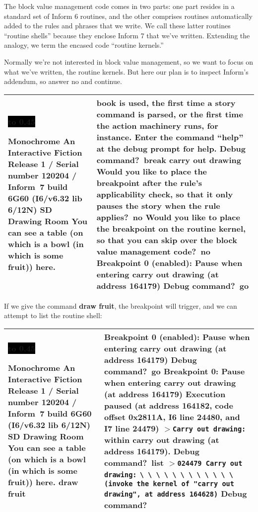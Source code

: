\documentclass{book}
\newcommand{\n}{\hspace*{\fill}\newline}
\newcommand{\terp}[2]{\begin{center}\begin{tabular}{p{0.45\textwidth}|p{0.45\textwidth}}\midrule #1&#2\\\midrule\end{tabular}\end{center}}
\newcommand{\glkheading}[1]{\textbf{#1}}
\newcommand{\glkinput}[1]{\textbf{#1}}
\newcommand{\glkstatusline}[2]{\centerline{\colorbox{black}{\hbox to 0.45\textwidth{\textcolor{white}{#1\hfil #2}}}}}
\newcommand{\storyprompt}{\raisebox{1.5pt}{\(>\)}}
\newcommand{\cursor}{\raisebox{-1.5pt}{\RectangleThin}}
\newcommand{\markedindent}{\(>\)\qquad}
\newcommand{\unmarkedindent}{\hphantom{\(>\)}\qquad}
\begin{document}
The block value management code comes in two parts: one part resides in a
standard set of Inform 6 routines, and the other comprises routines
automatically added to the rules and phrases that we write.  We call these
latter routines ``routine shells'' because they enclose Inform 7 that we've
written.  Extending the analogy, we term the encased code ``routine kernels.''

Normally we're not interested in block value management, so we want to focus on
what we've written, the routine kernels.  But here our plan is to inspect
Inform's addendum, so answer no and continue.

\terp{\glkstatusline{Drawing Room}{0/1}\n
  \glkheading{Monochrome}\n
  An Interactive Fiction\n
  Release 1 / Serial number 120204 / Inform~7 build 6G60 (I6/v6.32 lib 6/12N) SD\n
  \n
  \glkheading{Drawing Room}\n
  You can see a table (on which is a bowl (in which is some fruit)) here.\n
  \n
  \storyprompt\cursor}{%
  book is used, the first time a story command is parsed, or the first time the action machinery runs, for instance.\n
  \n
  Enter the command ``help'' at the debug prompt for help.\n
  \n
  Debug command?\ \glkinput{break carry out drawing}\n
  \n
  Would you like to place the breakpoint after the rule's applicability check, so that it only pauses the story when the rule applies?\ \glkinput{no}\n
  \n
  Would you like to place the breakpoint on the routine kernel, so that you can skip over the block value management code?\ \glkinput{no}\n
  \n
  Breakpoint 0 (enabled): Pause when entering carry out drawing (at address 164179)\n
  \n
  Debug command?\ \glkinput{go}}

If we give the command \glkinput{draw fruit}, the breakpoint will trigger, and
we can attempt to list the routine shell:

\terp{\glkstatusline{Drawing Room}{0/1}\n
  \glkheading{Monochrome}\n
  An Interactive Fiction\n
  Release 1 / Serial number 120204 / Inform~7 build 6G60 (I6/v6.32 lib 6/12N) SD\n
  \n
  \glkheading{Drawing Room}\n
  You can see a table (on which is a bowl (in which is some fruit)) here.\n
  \n
  \storyprompt\glkinput{draw fruit}}{%
  \n
  Breakpoint 0 (enabled): Pause when entering carry out drawing (at address 164179)\n
  \n
  Debug command?\ \glkinput{go}\n
  \n
  \glkheading{Breakpoint 0:} Pause when entering carry out drawing (at address 164179)\n
  \n
  Execution paused (at address 164182, code offset 0x2811A, I6 line 24480, and I7 line 24479)\n
  \markedindent \lstinline{Carry out drawing:}\n
  within carry out drawing (at address 164179).\n
  \n
  Debug command?\ \glkinput{list}\n
  \n
  \markedindent \lstinline{024479 Carry out drawing:}\n
  \unmarkedindent \lstinline{\ \ \ \ \ \ \ \ \ \ \ \ (invoke the kernel of "carry out drawing", at address 164628)}\n
  \n
  Debug command?\ \cursor}
\end{document}
